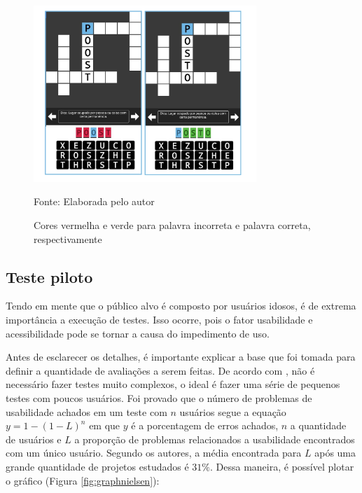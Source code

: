 \begin{figure}[H]
\centering
    \caption{Cores vermelha e verde para palavra incorreta e palavra correta, respectivamente}
    \label{fig:verdevermelho}
    \includegraphics[width=0.75\textwidth]{Figuras/verdevermelho.jpg}
    
    Fonte: Elaborada pelo autor
\end{figure}


\subsection{Teste piloto}
Tendo em mente que o público alvo é composto por usuários idosos, é de extrema importância a execução de testes. Isso ocorre, pois o fator usabilidade e acessibilidade pode se tornar a causa do impedimento de uso.

Antes de esclarecer os detalhes, é importante explicar a base que foi tomada para definir a quantidade de avaliações a serem feitas. De acordo com \cite{nielsenUsabilityMath}, não é necessário fazer testes muito complexos, o ideal é fazer uma série de pequenos testes com poucos usuários. Foi provado que o número de problemas de usabilidade achados em um teste com $n$ usuários segue a equação $y = 1-(1-L)^n$ em que $y$ é a porcentagem de erros achados, $n$ a quantidade de usuários e $L$ a proporção de problemas relacionados a usabilidade encontrados com um único usuário. Segundo os autores, a média encontrada para $L$ após uma grande quantidade de projetos estudados é $31\%$. Dessa maneira, é possível plotar o gráfico (Figura \ref{fig:graphnielsen}):

